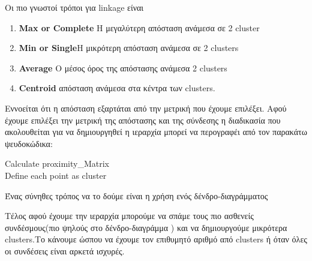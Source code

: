 Οι πιο γνωστοί τρόποι για linkage είναι 
\begin{enumerate}
\item \textbf{Max or Complete }Η μεγαλύτερη απόσταση ανάμεσα σε 2 cluster
\item \textbf{Min or Single}H μικρότερη απόσταση ανάμεσα σε 2 clusters 
\item \textbf{Average }Ο μέσος όρος της απόστασης  ανάμεσα 2 clusters 
\item \textbf{Centroid } απόσταση ανάμεσα στα κέντρα των clusters.
\end{enumerate}
Εννοείται ότι η απόσταση εξαρτάται από την μετρική που έχουμε επιλέξει.
 Αφού έχουμε επιλέξει την μετρική της απόστασης και της σύνδεσης η διαδικασία που ακολουθείται για να δημιουργηθεί η ιεραρχία μπορεί να περογραφέι από τον παρακάτω ψευδοκώδικα:
 
\begin{algorithm}[H]
Calculate proximity\_Matrix\\
Define each point as cluster\\
\end{algorithm}

\begin{minipage}{\linewidth}%
Ένας σύνηθες τρόπος να το δούμε είναι η  χρήση ενός δένδρο-διαγράμματος
\label{fig:dentro1}
\end{minipage}
 
Τέλος αφού έχουμε την ιεραρχία μπορούμε να σπάμε τους πιο ασθενείς συνδέσμους(πιο ψηλούς στο δένδρο-διαγράμμα ) και να δημιουργούμε μικρότερα clusters.Το κάνουμε ώσπου να έχουμε τον επιθυμητό αριθμό από clusters
ή όταν όλες οι συνδέσεις είναι αρκετά ισχυρές.


